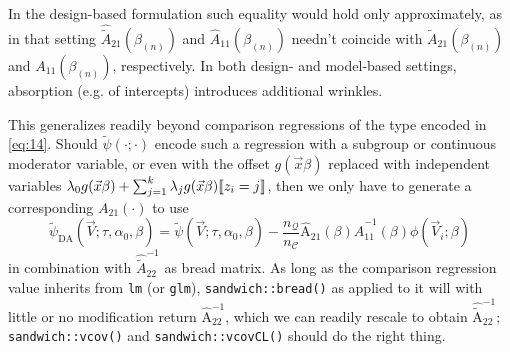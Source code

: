 \documentclass{article}
\DeclarePairedDelimiter{\indicator}{\llbracket}{\rrbracket}
\begin{document}
In the design-based formulation such equality would hold only approximately, as in that setting
$\hat{\tilde{A}}_{21}(\beta_{(n)})$ and $\hat{A}_{11}(\beta_{(n)})$ needn't
coincide with $\tilde{A}_{21}(\beta_{(n)})$ and ${A}_{11}(\beta_{(n)})$, respectively.  In both design- and model-based settings, absorption (e.g. of intercepts) introduces additional wrinkles.

This generalizes readily beyond comparison regressions of the type encoded in \eqref{eq:14}. Should $\tilde{\psi}(\cdot; \cdot)$ encode such a regression with a subgroup or continuous moderator variable, or even with the offset $g(\vec{x}\beta)$ replaced with independent variables $\lambda_{0}g(\vec{x}\beta) + \sum_{j=1}^{k}\lambda_{j} g(\vec{x}\beta)\indicator{z_{i}=j}$, then we only have to generate a corresponding ${A}_{21}(\cdot)$ to use
\begin{equation*}\label{eq:24}
      \tilde{\psi}_\text{DA}(\vec{V}; \tau, \alpha_{0},
    \beta) = \tilde{\psi} (\vec{V}; \tau,\alpha_{0},
    \beta) -
    \frac{n_{\mathcal{Q}}}{n_{\mathcal{C}}}
    \hat{\mathrm{A}}_{21}(\beta) \hat{A}_{11}^{-1}(\beta)\phi(\vec{V}_{i};
    \beta)
\end{equation*}
in combination with $\hat{\tilde{A}}_{22}^{-1}$ as bread matrix. As long as the comparison regression value inherits from \texttt{lm} (or \texttt{glm}), \texttt{sandwich::bread()} as applied to it will with little or no modification return
$\hat{\mathrm{A}}_{22}^{-1}$, which we can readily rescale to obtain $\hat{\tilde{\mathrm{A}}}_{22}^{-1}$; \texttt{sandwich::vcov()} and \texttt{sandwich::vcovCL()} should do the right thing.
\end{document}
